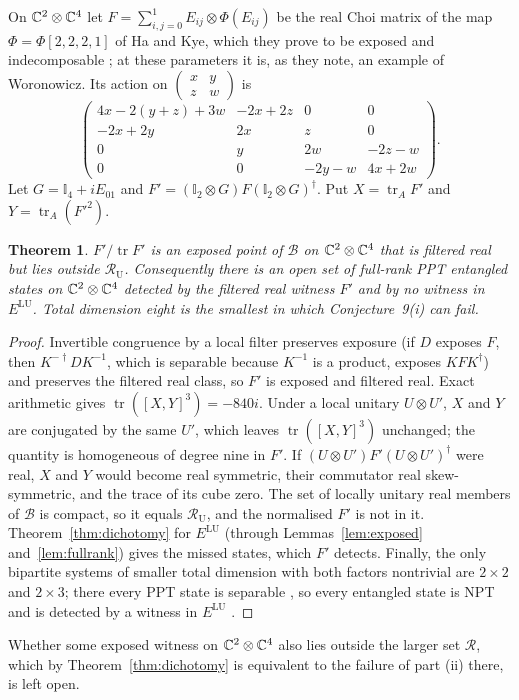 \documentclass[11pt,a4paper]{article}
\newtheorem{theorem}{Theorem}\newtheorem{lemma}[theorem]{Lemma}\newtheorem{prop}[theorem]{Proposition}\newtheorem{cor}[theorem]{Corollary}
\theoremstyle{definition}\newtheorem{definition}[theorem]{Definition}\newtheorem*{conj}{Conjecture 9 of Shen, Chen and Bian}\newtheorem{remark}[theorem]{Remark}
\newcommand{\tr}{\operatorname{tr}}\newcommand{\im}{\operatorname{Im}}\newcommand{\adj}{\operatorname{adj}}\newcommand{\id}{\mathbb I}
\newcommand{\cB}{\mathcal B}\newcommand{\cR}{\mathcal R}\newcommand{\vecm}{\mathrm{vec}}
\begin{document}
On $\mathbb C^2\otimes\mathbb C^4$ let $F=\sum_{i,j=0}^1 E_{ij}\otimes\Phi(E_{ij})$ be the real Choi matrix of the map $\Phi=\Phi[2,2,2,1]$ of Ha and Kye, which they prove to be exposed and indecomposable \cite[Theorem 3.2]{hk24}; at these parameters it is, as they note, an example of Woronowicz. Its action on $\left(\begin{smallmatrix}x&y\\z&w\end{smallmatrix}\right)$ is
\[
 \begin{pmatrix}
 4x-2(y+z)+3w & -2x+2z &0&0\\
 -2x+2y&2x&z&0\\
 0&y&2w&-2z-w\\
 0&0&-2y-w&4x+2w
 \end{pmatrix}.
\]
Let $G=\id_4+iE_{01}$ and $F'=(\id_2\otimes G)F(\id_2\otimes G)^\dagger$. Put $X=\tr_A F'$ and $Y=\tr_A (F'^2)$.

\begin{theorem}\label{thm:2x4}
$F'/\tr F'$ is an exposed point of $\cB$ on $\mathbb C^2\otimes\mathbb C^4$ that is filtered real but lies outside $\cR_{\mathrm U}$. Consequently there is an open set of full-rank PPT entangled states on $\mathbb C^2\otimes\mathbb C^4$ detected by the filtered real witness $F'$ and by no witness in $E^{\mathrm{LU}}$. Total dimension eight is the smallest in which Conjecture~9(i) can fail.
\end{theorem}
\begin{proof}
Invertible congruence by a local filter preserves exposure (if $D$ exposes $F$, then $K^{-\dagger}DK^{-1}$, which is separable because $K^{-1}$ is a product, exposes $KFK^\dagger$) and preserves the filtered real class, so $F'$ is exposed and filtered real. Exact arithmetic gives $\tr([X,Y]^3)=-840i$. Under a local unitary $U\otimes U'$, $X$ and $Y$ are conjugated by the same $U'$, which leaves $\tr([X,Y]^3)$ unchanged; the quantity is homogeneous of degree nine in $F'$. If $(U\otimes U')F'(U\otimes U')^\dagger$ were real, $X$ and $Y$ would become real symmetric, their commutator real skew-symmetric, and the trace of its cube zero. The set of locally unitary real members of $\cB$ is compact, so it equals $\cR_{\mathrm U}$, and the normalised $F'$ is not in it. Theorem~\ref{thm:dichotomy} for $E^{\mathrm{LU}}$ (through Lemmas~\ref{lem:exposed} and~\ref{lem:fullrank}) gives the missed states, which $F'$ detects. Finally, the only bipartite systems of smaller total dimension with both factors nontrivial are $2\times2$ and $2\times3$; there every PPT state is separable \cite{horodecki}, so every entangled state is NPT and is detected by a witness in $E^{\mathrm{LU}}$ \cite[Lemma 10(i)]{shen}.
\end{proof}
Whether some exposed witness on $\mathbb C^2\otimes\mathbb C^4$ also lies outside the larger set $\cR$, which by Theorem~\ref{thm:dichotomy} is equivalent to the failure of part (ii) there, is left open.
\end{document}
